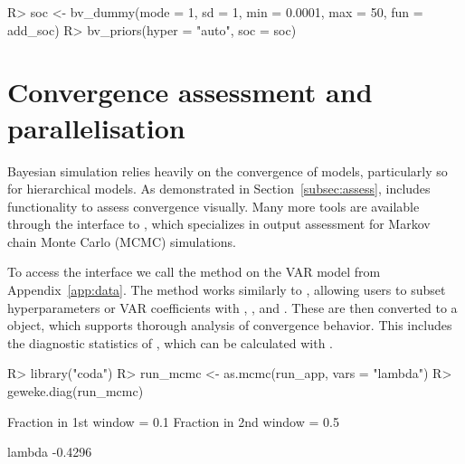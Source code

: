 \documentclass[article,nojss]{jss} %
\begin{document}
\begin{appendix}
\begin{Schunk}
\begin{Sinput}
R> soc <- bv_dummy(mode = 1, sd = 1, min = 0.0001, max = 50, fun = add_soc)
R> bv_priors(hyper = "auto", soc = soc)
\end{Sinput}
\end{Schunk}


\section{Convergence assessment and parallelisation} \label{app:conv}

Bayesian simulation relies heavily on the convergence of models, particularly so for hierarchical models. As demonstrated in Section~\ref{subsec:assess},  includes functionality to assess convergence visually. Many more tools are available through the interface to , which specializes in output assessment for Markov chain Monte Carlo (MCMC) simulations.

To access the interface we call the  method on the VAR model from Appendix~\ref{app:data}. The method works similarly to , allowing users to subset hyperparameters or VAR coefficients with , , and .
These are then converted to a  object, which supports thorough analysis of convergence behavior. This includes the diagnostic statistics of \cite{geweke1992}, which can be calculated with .

\begin{Schunk}
\begin{Sinput}
R> library("coda")
R> run_mcmc <- as.mcmc(run_app, vars = "lambda")
R> geweke.diag(run_mcmc)
\end{Sinput}
\begin{Soutput}
Fraction in 1st window = 0.1
Fraction in 2nd window = 0.5 

 lambda 
-0.4296 
\end{Soutput}
\end{Schunk}


\end{appendix}
\end{document}
